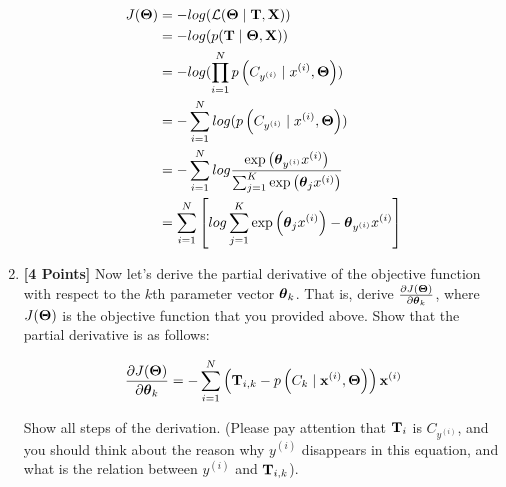 \begin{enumerate}[label=(\alph*)]
    \begin{solution}
    \begin{equation}\nonumber
    \begin{aligned}
    J(\boldsymbol \Theta) 
    &= -log(\mathcal{L}(\boldsymbol \Theta \mid \mathbf{T}, \mathbf{X})) \\
    &= -log(p(\mathbf{T} \mid \boldsymbol \Theta, \mathbf{X}))\\
    &= -log(\prod_{i = 1}^Np\left(C_{y^{(i)}} \mid x^{(i)}, \boldsymbol \Theta \right))\\
    &= -\sum_{i = 1}^Nlog(p\left(C_{y^{(i)}} \mid x^{(i)}, \boldsymbol \Theta \right))\\
    &= -\sum_{i = 1}^Nlog\frac{\exp\left(\boldsymbol \theta_{y^{(i)}} x^{(i)} \right)}{\sum_{j = 1}^K \exp\left(\boldsymbol \theta_{j} x^{(i)}\right)}\\
    &= \sum_{i = 1}^N\left[log\sum_{j = 1}^K \exp\left(\boldsymbol \theta_{j} x^{(i)}\right) - \boldsymbol \theta_{y^{(i)}} x^{(i)}\right]
    \end{aligned}
    \end{equation}
    \bigskip \bigskip \bigskip \bigskip \bigskip \bigskip \bigskip \bigskip
    \bigskip \bigskip \bigskip \bigskip \bigskip \bigskip \bigskip \bigskip
    \bigskip \bigskip \bigskip \bigskip \bigskip \bigskip \bigskip \bigskip
    \bigskip \bigskip \bigskip \bigskip \bigskip \bigskip \bigskip \bigskip
    \end{solution}
    
    \clearpage
    
    \item {\bf [4 Points]} Now let's derive the partial derivative of the objective function with respect to the $k$th parameter vector $\boldsymbol \theta_k$. That is, derive $\frac{ \partial J(\boldsymbol \Theta) }{ \partial \boldsymbol \theta_k}$, where $J(\boldsymbol \Theta)$ is the objective function that you provided above. Show that the partial derivative  is as follows:
    
    $$
    \frac{\partial J(\boldsymbol \Theta)}{\partial \boldsymbol \theta_k} = - \sum_{i = 1}^N \left(\mathbf{T}_{i, k} - p\left(C_k \mid \mathbf{x}^{(i)}, \boldsymbol \Theta\right)\right)  \mathbf{x}^{(i)}
    $$
    
    Show all steps of the derivation. (Please pay attention that $\mathbf{T}_i$ is $C_{y^{(i)}}$, and you should think about the reason why $y^{(i)}$ disappears in this equation, and what is the relation between $y^{(i)}$ and $\mathbf{T}_{i, k}$).
    

\end{enumerate}
